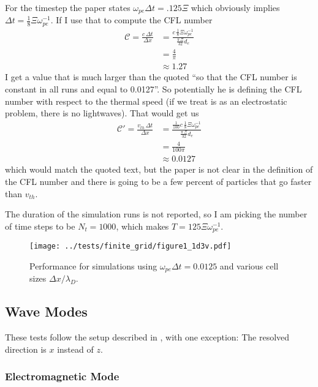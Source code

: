 \documentclass[%
preprint,
amsmath,amssymb,
aps,
]{revtex4-2}
\begin{document}
For the timestep the paper states $\omega_{pe}\Delta{t} = .125\Xi$ which
obviously implies $\Delta{t} = \frac{1}{8}\Xi\omega_{pe}^{-1}$. If I use that
to compute the CFL number
\begin{align}
    \mathcal{C} = \frac{c\,\Delta{t}}{\Delta{x}} &= \frac{c\, \frac{1}{8}\Xi\omega_{pe}^{-1}}{\frac{\pi\,\Xi}{32}d_e} \\
        & = \frac{4}{\pi} \\
        & \approx 1.27
\end{align}
I get a value that is much larger than the quoted ``so that the CFL number is
constant in all runs and equal to 0.0127''.  So potentially he is defining the
CFL number with respect to the thermal speed (if we treat is as an
electrostatic problem, there is no lightwaves). That would get us
\begin{align}
    \mathcal{C'} = \frac{v_{th}\,\Delta{t}}{\Delta{x}} &= \frac{\frac{1}{100}c\, \frac{1}{8}\Xi\omega_{pe}^{-1}}{\frac{\pi\,\Xi}{32}d_e} \\
        & = \frac{4}{100\pi} \\
        & \approx 0.0127
\end{align}
which would match the quoted text, but the paper is not clear in the definition
of the CFL number and there is going to be a few percent of particles that go
faster than $v_{th}$.

The duration of the simulation runs is not reported, so I am picking the number
of time steps to be $N_t = 1000$, which makes $T = 125\Xi\omega_{pe}^{-1}$.

\begin{figure}
    \centering
    \texttt{[image: ../tests/finite\_grid/figure1\_1d3v.pdf]}
    \caption{Performance for simulations using $\omega_{pe} \Delta{t} = 0.0125$ and various cell sizes $\Delta{x}/\lambda_D$.}
    \label{fig:fgi_fig7}
\end{figure}

\FloatBarrier

\subsection{Wave Modes}
\label{subsec:wavemodes}
These tests follow the setup described in \cite{kilian_2017}, with one exception: The resolved direction is $x$ instead of $z$.

\subsubsection{Electromagnetic Mode}
\end{document}

